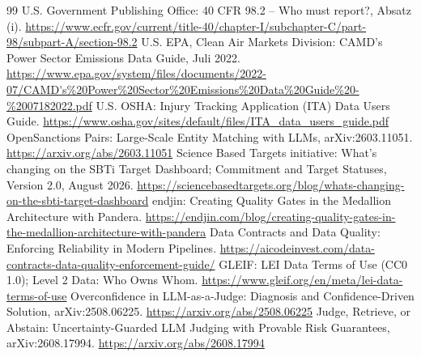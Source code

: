 \documentclass[11pt,a4paper]{article}
\begin{document}
\begin{thebibliography}{99}\small
{} U.S. Government Publishing Office: 40 CFR 98.2 -- Who must report?, Absatz (i). \url{https://www.ecfr.gov/current/title-40/chapter-I/subchapter-C/part-98/subpart-A/section-98.2}
 U.S. EPA, Clean Air Markets Division: CAMD's Power Sector Emissions Data Guide, Juli 2022. \url{https://www.epa.gov/system/files/documents/2022-07/CAMD's\%20Power\%20Sector\%20Emissions\%20Data\%20Guide\%20-\%2007182022.pdf}
 U.S. OSHA: Injury Tracking Application (ITA) Data Users Guide. \url{https://www.osha.gov/sites/default/files/ITA_data_users_guide.pdf}
 OpenSanctions Pairs: Large-Scale Entity Matching with LLMs, arXiv:2603.11051. \url{https://arxiv.org/abs/2603.11051}
 Science Based Targets initiative: What's changing on the SBTi Target Dashboard; Commitment and Target Statuses, Version 2.0, August 2026. \url{https://sciencebasedtargets.org/blog/whats-changing-on-the-sbti-target-dashboard}
 endjin: Creating Quality Gates in the Medallion Architecture with Pandera. \url{https://endjin.com/blog/creating-quality-gates-in-the-medallion-architecture-with-pandera}
 Data Contracts and Data Quality: Enforcing Reliability in Modern Pipelines. \url{https://aicodeinvest.com/data-contracts-data-quality-enforcement-guide/}
 GLEIF: LEI Data Terms of Use (CC0 1.0); Level 2 Data: Who Owns Whom. \url{https://www.gleif.org/en/meta/lei-data-terms-of-use}
 Overconfidence in LLM-as-a-Judge: Diagnosis and Confidence-Driven Solution, arXiv:2508.06225. \url{https://arxiv.org/abs/2508.06225}
 Judge, Retrieve, or Abstain: Uncertainty-Guarded LLM Judging with Provable Risk Guarantees, arXiv:2608.17994. \url{https://arxiv.org/abs/2608.17994}
\end{thebibliography}
\end{document}

